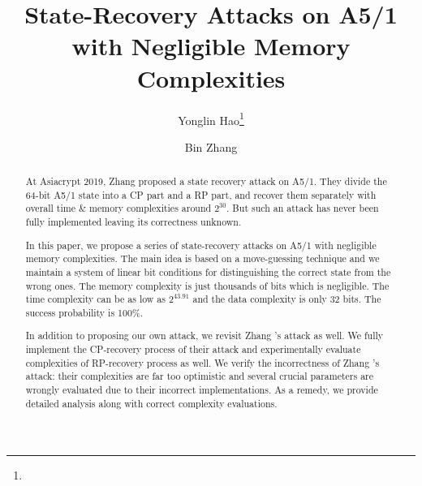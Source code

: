 
\renewcommand{\algorithmicrequire}{\textbf{Input:}}
\renewcommand{\algorithmicensure}{\textbf{Output:}}

        
\mainmatter
\title{State-Recovery Attacks on A5/1 with Negligible Memory Complexities}
\author{Yonglin Hao\thanks{ }
\and
Bin Zhang }
\maketitle


%




\begin{abstract}
At Asiacrypt 2019, Zhang \etal proposed a state recovery attack on A5/1.
They divide the 64-bit A5/1 state into a CP part and a RP part, and recover them separately with overall time \& memory complexities around $2^{30}$.
But such an attack has never been fully implemented leaving its correctness unknown.

In this paper, we propose a series of state-recovery attacks on A5/1 with negligible memory complexities.
The main idea is based on a move-guessing technique and we maintain a system of linear bit conditions for distinguishing the correct state from the wrong ones.
The memory complexity is just thousands of bits which is negligible.
The time complexity can be as low as $2^{43.91}$ and the data complexity is only 32 bits.
The success probability is 100\%.

In addition to proposing our own attack, we revisit Zhang \etal's attack as well.
We fully implement the CP-recovery process of their attack and experimentally evaluate complexities of RP-recovery process as well.
We verify the incorrectness of Zhang \etal's attack: their complexities are far too optimistic and several crucial parameters are wrongly evaluated due to their incorrect implementations.
As a remedy, we provide detailed analysis along with correct complexity evaluations.
\end{abstract}

